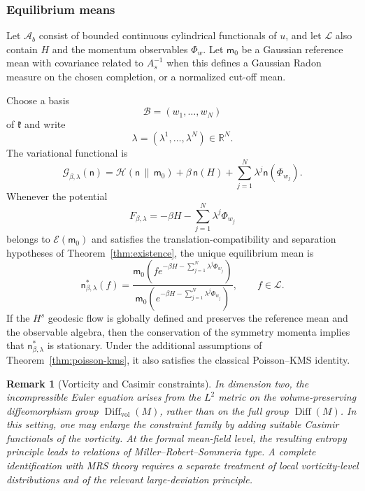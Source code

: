 \documentclass[11pt,reqno]{amsart}
\newtheorem{rem}[Theorem]{Remark}
\begin{document}
\subsubsection*{Equilibrium means}

Let $\mathcal A_b$ consist of bounded continuous cylindrical
functionals of $u$, and let $\mathcal L$ also contain $H$ and the
momentum observables $\Phi_w$. Let $\mathsf m_0$ be a Gaussian reference
mean with covariance related to $A_s^{-1}$ when this defines a Gaussian
Radon measure on the chosen completion, or a normalized cut-off mean.

Choose a basis
\[
\mathcal B=(w_1,\ldots,w_N)
\]
of $\mathfrak k$ and write
\[
\lambda=(\lambda^1,\ldots,\lambda^N)\in\mathbb R^N.
\]
The variational functional is
\[
\mathcal G_{\beta,\lambda}(\mathsf n)
=
\mathcal H(\mathsf n\,\|\,\mathsf m_0)
+
\beta\,\mathsf n(H)
+
\sum_{j=1}^{N}
\lambda^j\mathsf n(\Phi_{w_j}).
\]
Whenever the potential
\[
F_{\beta,\lambda}
=
-\beta H-\sum_{j=1}^{N}\lambda^j\Phi_{w_j}
\]
belongs to $\mathcal E(\mathsf m_0)$ and satisfies the
translation-compatibility and separation hypotheses of
Theorem~\ref{thm:existence}, the unique equilibrium mean is
\[
\boxed{
\mathsf n_{\beta,\lambda}^*(f)
=
\frac{
\mathsf m_0
\left(
f e^{-\beta H-\sum_{j=1}^{N}\lambda^j\Phi_{w_j}}
\right)
}{
\mathsf m_0
\left(
e^{-\beta H-\sum_{j=1}^{N}\lambda^j\Phi_{w_j}}
\right)
},
\qquad
f\in\mathcal L.
}
\]
If the $H^s$ geodesic flow is globally defined and preserves the
reference mean and the observable algebra, then the conservation of the
symmetry momenta implies that $\mathsf n_{\beta,\lambda}^*$ is
stationary. Under the additional assumptions of
Theorem~\ref{thm:poisson-kms}, it also satisfies the classical
Poisson--KMS identity.

\begin{rem}[Vorticity and Casimir constraints]
In dimension two, the incompressible Euler equation arises from the
$L^2$ metric on the volume-preserving diffeomorphism group
$\operatorname{Diff}_{\operatorname{vol}}(M)$, rather than on the full
group $\operatorname{Diff}(M)$. In this setting, one may enlarge the
constraint family by adding suitable Casimir functionals of the
vorticity. At the formal mean-field level, the resulting entropy
principle leads to relations of Miller--Robert--Sommeria type. A
complete identification with MRS theory requires a separate treatment
of local vorticity-level distributions and of the relevant
large-deviation principle.
\end{rem}
\end{document}
